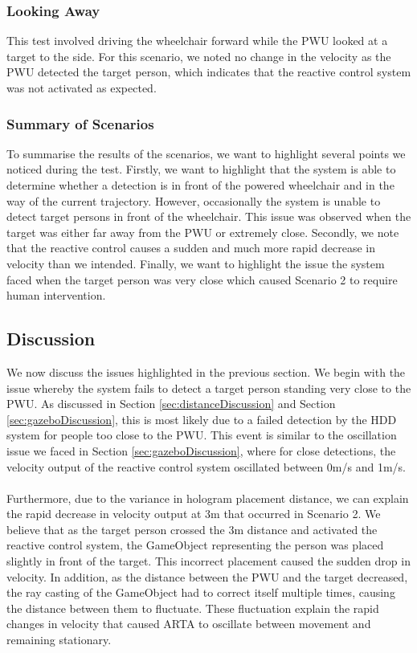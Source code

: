 \subsubsection{Looking Away}
This test involved driving the wheelchair forward while the PWU looked at a target to the side. For this scenario, we noted no change in the velocity as the PWU detected the target person, which indicates that the reactive control system was not activated as expected.

\subsubsection{Summary of Scenarios}
To summarise the results of the scenarios, we want to highlight several points we noticed during the test. Firstly, we want to highlight that the system is able to determine whether a detection is in front of the powered wheelchair and in the way of the current trajectory. However, occasionally the system is unable to detect target persons in front of the wheelchair. This issue was observed when the target was either far away from the PWU or extremely close. Secondly, we note that the reactive control causes a sudden and much more rapid decrease in velocity than we intended. Finally, we want to highlight the issue the system faced when the target person was very close which caused Scenario 2 to require human intervention.

\subsection{Discussion}
We now discuss the issues highlighted in the previous section. We begin with the issue whereby the system fails to detect a target person standing very close to the PWU. As discussed in Section \ref{sec:distanceDiscussion} and Section \ref{sec:gazeboDiscussion}, this is most likely due to a failed detection by the HDD system for people too close to the PWU. This event is similar to the oscillation issue we faced in Section \ref{sec:gazeboDiscussion}, where for close detections, the velocity output of the reactive control system oscillated between 0m/s and 1m/s. 

\paragraph{} Furthermore, due to the variance in hologram placement distance, we can explain the rapid decrease in velocity output at 3m that occurred in Scenario 2. We believe that as the target person crossed the 3m distance and activated the reactive control system, the GameObject representing the person was placed slightly in front of the target. This incorrect placement caused the sudden drop in velocity. In addition, as the distance between the PWU and the target decreased, the ray casting of the GameObject had to correct itself multiple times, causing the distance between them to fluctuate. These fluctuation explain the rapid changes in velocity that caused ARTA to oscillate between movement and remaining stationary.


